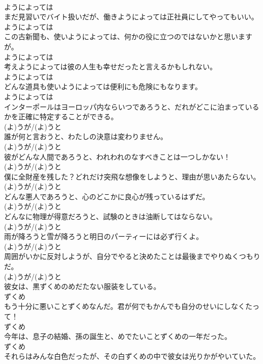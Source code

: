 \documentclass[8pt]{extreport}
\begin{document}
\begin{CJK}{UTF8}{min}
\\	ようによっては
\\	まだ見習いでバイト扱いだが、働きようによっては正社員にしてやってもいい。	
\\	ようによっては
\\	この古新聞も、使いようによっては、何かの役に立つのではないかと思いますが。	
\\	ようによっては
\\	考えようによっては彼の人生も幸せだったと言えるかもしれない。	
\\	ようによっては
\\	どんな道具も使いようによっては便利にも危険にもなります。	
\\	ようによっては
\\	インターポールはヨーロッパ内ならいつであろうと、だれがどこに泊まっているかを正確に特定することができる。	
\\	(よ)うが/(よ)うと
\\	誰が何と言おうと、わたしの決意は変わりません。	
\\	(よ)うが/(よ)うと
\\	彼がどんな人間であろうと、われわれのなすべきことは一つしかない！	
\\	(よ)うが/(よ)うと
\\	僕に全財産を残した？どれだけ突飛な想像をしようと、理由が思いあたらない。	
\\	(よ)うが/(よ)うと
\\	どんな悪人であろうと、心のどこかに良心が残っているはずだ。	
\\	(よ)うが/(よ)うと
\\	どんなに物理が得意だろうと、試験のときは油断してはならない。	
\\	(よ)うが/(よ)うと
\\	雨が降ろうと雪が降ろうと明日のパーティーには必ず行くよ。	
\\	(よ)うが/(よ)うと
\\	周囲がいかに反対しようが、自分でやると決めたことは最後までやりぬくつもりだ。	
\\	(よ)うが/(よ)うと
\\	彼女は、黒ずくめのめだたない服装をしている。	
\\	ずくめ
\\	もう十分に悪いことずくめなんだ。君が何でもかんでも自分のせいにしなくたって！	
\\	ずくめ
\\	今年は、息子の結婚、孫の誕生と、めでたいことずくめの一年だった。	
\\	ずくめ
\\	それらはみんな白色だったが、その白ずくめの中で彼女は光りかがやいていた。	

\end{CJK}
\end{document}
